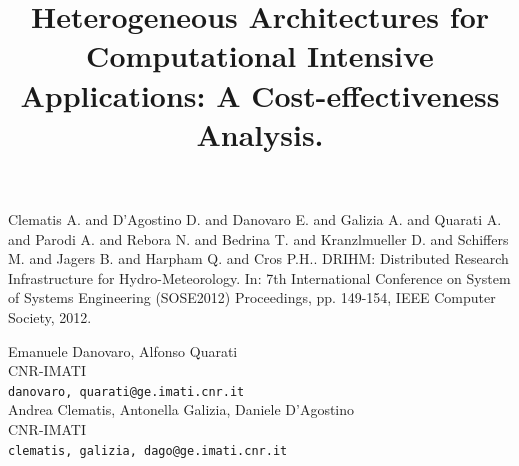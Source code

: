 \documentclass[article,A4,11pt]{llncs}%
\begin{document}

\begin{thebibliography}{10}
{\sc Clematis A. and D'Agostino D. and Danovaro E. and Galizia A. and Quarati A. and Parodi A. and Rebora N. and Bedrina T. and Kranzlmueller D. and Schiffers M. and Jagers B. and Harpham Q. and Cros P.H.}. {DRIHM: Distributed Research Infrastructure for Hydro-Meteorology}. In: 7th International Conference on System of Systems Engineering (SOSE2012) Proceedings, pp. 149-154, IEEE Computer Society, 2012.
\end{thebibliography}

\title{Heterogeneous Architectures for Computational Intensive Applications: A Cost-effectiveness Analysis.}
 \author{} \institute{}
\maketitle
\begin{center}
{\large Emanuele Danovaro, Alfonso Quarati}\\
CNR-IMATI\\
{\tt {danovaro, quarati}@ge.imati.cnr.it}
\\ \vspace{4mm}
{\large Andrea Clematis, Antonella Galizia, Daniele D'Agostino}\\
CNR-IMATI\\
{\tt {clematis, galizia, dago}@ge.imati.cnr.it}
\end{center}
\end{document}
